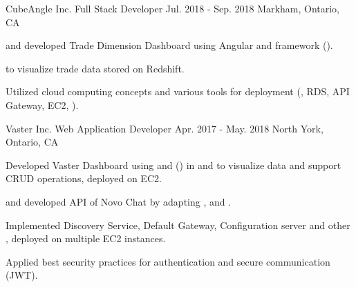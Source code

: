 \begin{cventries}
  \cventry
    {CubeAngle Inc.} %
    {Full Stack Developer} %
    {Jul. 2018 - Sep. 2018} %
    {Markham, Ontario, CA} %
    {
      \begin{cvitems} %
        \item { and developed Trade Dimension Dashboard using Angular and  framework ().}
          \begin{cvsubitems}
            \item { to visualize trade data stored on  Redshift.}
          \end{cvsubitems}
        \item {Utilized cloud computing concepts and various  tools for deployment (, RDS, API Gateway,  EC2, ).}
      \end{cvitems}
    }

  \cventry
    {Vaster Inc.} %
    {Web Application Developer} %
    {Apr. 2017 - May. 2018} %
    {North York, Ontario, CA} %
    {
      \begin{cvitems} %
        \item {Developed Vaster Dashboard using  and  () in  and  to visualize data and support CRUD operations, deployed on  EC2.}
        \item { and developed  API of Novo Chat by adapting ,  and .}
        \begin{cvsubitems}
          \item {Implemented Discovery Service, Default Gateway, Configuration server and other , deployed on multiple  EC2 instances.}
        \end{cvsubitems}
        \item {Applied best security practices for authentication and  secure communication (JWT).}
      \end{cvitems}
    }

\end{cventries}
